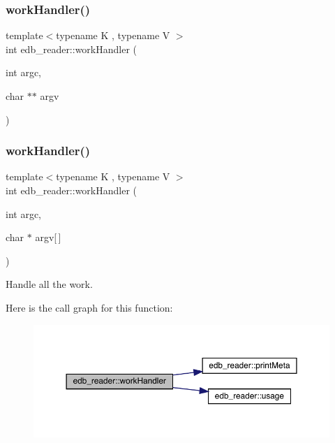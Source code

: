 \mbox{\label{namespaceedb__reader_af7f03dfd858d5d80986e77d069b1ccbd}} 
\subsubsection{\texorpdfstring{workHandler()}{workHandler()}\hspace{0.1cm}{\footnotesize\ttfamily [1/2]}}
{\footnotesize\ttfamily template$<$typename K , typename V $>$ \\
int edb\+\_\+reader\+::work\+Handler (\begin{DoxyParamCaption}\item[{int}]{argc,  }\item[{char $\ast$$\ast$}]{argv }\end{DoxyParamCaption})}

\mbox{\label{namespaceedb__reader_a25cd3a48db32e167495d3229528e6cdb}} 
\subsubsection{\texorpdfstring{workHandler()}{workHandler()}\hspace{0.1cm}{\footnotesize\ttfamily [2/2]}}
{\footnotesize\ttfamily template$<$typename K , typename V $>$ \\
int edb\+\_\+reader\+::work\+Handler (\begin{DoxyParamCaption}\item[{int}]{argc,  }\item[{char $\ast$}]{argv\mbox{[}$\,$\mbox{]} }\end{DoxyParamCaption})}



Handle all the work. 

Here is the call graph for this function\+:
\nopagebreak
\begin{figure}[H]
\begin{center}
\leavevmode
\includegraphics[width=350pt]{d8/d4f/namespaceedb__reader_a25cd3a48db32e167495d3229528e6cdb_cgraph}
\end{center}
\end{figure}
